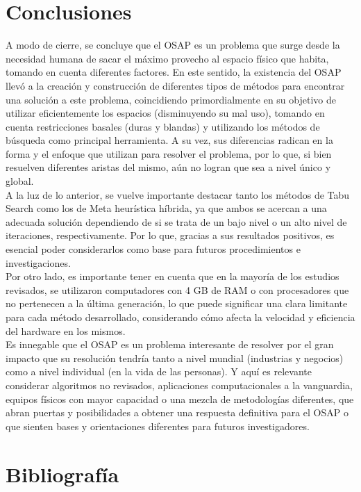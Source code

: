 \documentclass[letter, 10pt]{article}
\begin{document}

\section{Conclusiones}
A modo de cierre, se concluye que el OSAP es un problema que surge desde la necesidad humana de sacar el m\'aximo provecho al espacio f\'isico que habita, tomando en cuenta diferentes factores. En este sentido, la existencia del OSAP llev\'o a la creaci\'on y construcci\'on de diferentes tipos de m\'etodos para encontrar una soluci\'on a este problema, coincidiendo primordialmente en su objetivo de utilizar eficientemente los espacios (disminuyendo su mal uso), tomando en cuenta restricciones basales (duras y blandas) y utilizando los m\'etodos de b\'usqueda como principal herramienta. A su vez, sus diferencias radican en la forma y el enfoque que utilizan para resolver el problema, por lo que, si bien resuelven diferentes aristas del mismo, a\'un no logran que sea a nivel \'unico y global. \\
A la luz de lo anterior, se vuelve importante destacar tanto los m\'etodos de Tabu Search como los de Meta heur\'istica h\'ibrida, ya que ambos se acercan a una adecuada soluci\'on dependiendo de si se trata de un bajo nivel o un alto nivel de iteraciones, respectivamente. Por lo que, gracias a sus resultados positivos, es esencial poder considerarlos como base para futuros procedimientos e investigaciones.\\
Por otro lado, es importante tener en cuenta que en la mayor\'ia de los estudios revisados, se utilizaron computadores con 4 GB de RAM o con procesadores que no pertenecen a la \'ultima generaci\'on, lo que puede significar una clara limitante para cada m\'etodo desarrollado, considerando c\'omo afecta la velocidad y eficiencia del hardware en los mismos. \\
Es innegable que el OSAP es un problema interesante de resolver por el gran impacto que su resoluci\'on tendr\'ia tanto a nivel mundial (industrias y negocios) como a nivel individual (en la vida de las personas). Y aqu\'i es relevante considerar algoritmos no revisados, aplicaciones computacionales a la vanguardia, equipos f\'isicos con mayor capacidad o una mezcla de metodolog\'ias diferentes, que abran puertas y posibilidades a obtener una respuesta definitiva para el OSAP o que sienten bases y orientaciones diferentes para futuros investigadores. 
\section{Bibliograf\'ia}


\end{document}
